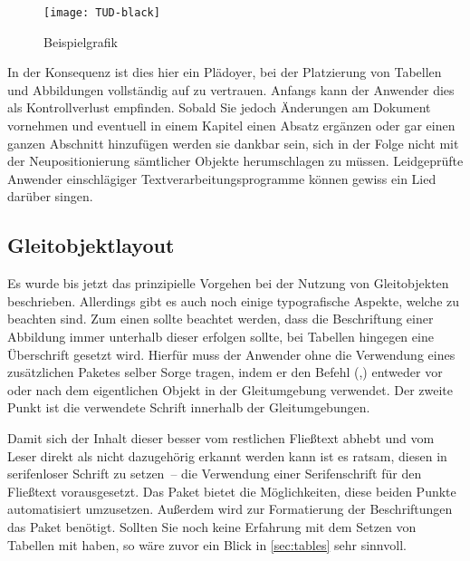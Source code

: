 \documentclass[%
  english,ngerman,%
  cdgeometry=no,DIV=12,%
  cd=false,cdfont=false,cdtitle=true,%
  headings=normal,%
  automark,%
  listof=toc,%
]{tudscrartcl}
\begin{document}
\begin{Trunk}
\begin{figure}
\centering
\texttt{[image: TUD-black]}
\caption{Beispielgrafik}\label{fig:example}
\end{figure}

\end{Trunk}
\InputCode\noindent
%
In der Konsequenz ist dies hier ein Plädoyer, bei der Platzierung von Tabellen 
und Abbildungen vollständig auf  zu vertrauen. Anfangs kann der 
Anwender dies als Kontrollverlust empfinden. Sobald Sie jedoch Änderungen am 
Dokument vornehmen und eventuell in einem Kapitel einen Absatz ergänzen oder 
gar einen ganzen Abschnitt hinzufügen werden sie dankbar sein, sich in der 
Folge nicht mit der Neupositionierung sämtlicher Objekte herumschlagen zu 
müssen. Leidgeprüfte Anwender einschlägiger Textverarbeitungsprogramme können 
gewiss ein Lied darüber singen.



\subsection{Gleitobjektlayout}
\label{sec:floatlayout}%
%
Es wurde bis jetzt das prinzipielle Vorgehen bei der Nutzung von Gleitobjekten 
beschrieben. Allerdings gibt es auch noch einige typografische Aspekte, welche 
zu beachten sind. Zum einen sollte beachtet werden, dass die Beschriftung einer 
Abbildung immer unterhalb dieser erfolgen sollte, bei Tabellen hingegen eine 
Überschrift gesetzt wird. Hierfür muss der Anwender ohne die Verwendung eines 
zusätzlichen Paketes selber Sorge tragen, indem er den Befehl 
(,) entweder vor oder 
nach dem eigentlichen Objekt in der Gleitumgebung verwendet. Der zweite Punkt 
ist die verwendete Schrift innerhalb der Gleitumgebungen. 

Damit sich der Inhalt dieser besser vom restlichen Fließtext abhebt und vom 
Leser direkt als nicht dazugehörig erkannt werden kann ist es ratsam, diesen in 
serifenloser Schrift zu setzen~-- die Verwendung einer Serifenschrift für den 
Fließtext vorausgesetzt. Das Paket  bietet die Möglichkeiten, 
diese beiden Punkte automatisiert umzusetzen. Außerdem wird zur Formatierung 
der Beschriftungen das Paket  benötigt. Sollten Sie noch keine 
Erfahrung mit dem Setzen von Tabellen mit  haben, so wäre zuvor 
ein Blick in \autoref{sec:tables} sehr sinnvoll. 
\end{document}
